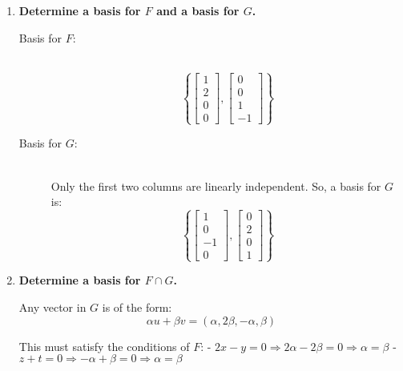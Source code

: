 \documentclass[12pt]{article}
\begin{document}
\begin{answerbox}
\begin{enumerate}

    \item \textbf{Determine a basis for $ F $ and a basis for $ G $.}

    \begin{description}
        \item[Basis for $ F $:] \\
            $$
            \boxed{
            \left\{
            \begin{bmatrix}
            1 \\ 2 \\ 0 \\ 0
            \end{bmatrix},
            \begin{bmatrix}
            0 \\ 0 \\ 1 \\ -1
            \end{bmatrix}
            \right\}
            }
            $$

            \item[Basis for $ G $:] \\
            Only the first two columns are linearly independent. So, a basis for $ G $ is:
            $$
            \boxed{
            \left\{
            \begin{bmatrix}
            1 \\ 0 \\ -1 \\ 0
            \end{bmatrix},
            \begin{bmatrix}
            0 \\ 2 \\ 0 \\ 1
            \end{bmatrix}
            \right\}
            }
            $$
    \end{description}

    \item \textbf{Determine a basis for $ F \cap G $.}

    Any vector in $ G $ is of the form:
    $$
    \alpha u + \beta v = (\alpha, 2\beta, -\alpha, \beta)
    $$
    
    This must satisfy the conditions of $ F $:
    - $ 2x - y = 0 \Rightarrow 2\alpha - 2\beta = 0 \Rightarrow \alpha = \beta $
    - $ z + t = 0 \Rightarrow -\alpha + \beta = 0 \Rightarrow \alpha = \beta $
    

\end{enumerate}
\end{answerbox}
\end{document}
